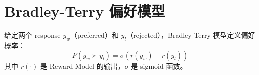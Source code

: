 \section{Bradley-Terry 偏好模型}
给定两个 response $y_w$（preferred）和 $y_l$（rejected），Bradley-Terry 模型定义偏好概率：
$$P(y_w \succ y_l) = \sigma(r(y_w) - r(y_l))$$
其中 $r(\cdot)$ 是 Reward Model 的输出，$\sigma$ 是 sigmoid 函数。

